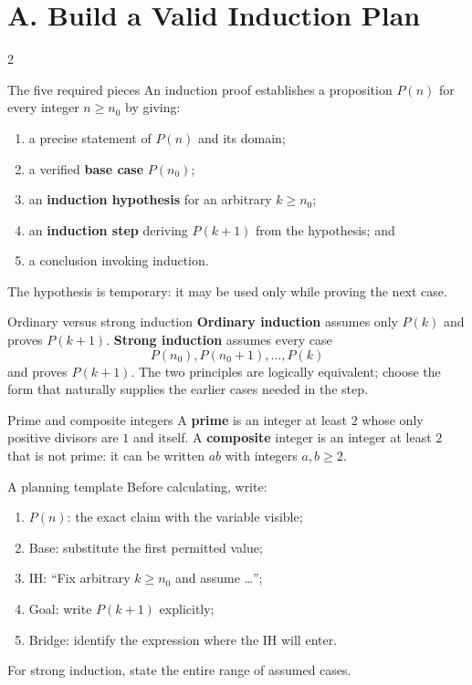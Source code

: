 \documentclass[10pt]{article}
\newcommand{\term}[1]{\textbf{\color{CoreNavy}#1}}
\begin{document}
\small

\section*{A. Build a Valid Induction Plan}
\begin{multicols}{2}
\begin{definitionbox}{The five required pieces}
An induction proof establishes a proposition $P(n)$ for every integer
$n\ge n_0$ by giving:
\begin{enumerate}
  \item a precise statement of $P(n)$ and its domain;
  \item a verified \term{base case} $P(n_0)$;
  \item an \term{induction hypothesis} for an arbitrary $k\ge n_0$;
  \item an \term{induction step} deriving $P(k+1)$ from the hypothesis; and
  \item a conclusion invoking induction.
\end{enumerate}
The hypothesis is temporary: it may be used only while proving the next case.
\end{definitionbox}

\begin{definitionbox}{Ordinary versus strong induction}
\term{Ordinary induction} assumes only $P(k)$ and proves $P(k+1)$.
\term{Strong induction} assumes every case
\[
P(n_0),P(n_0+1),\ldots,P(k)
\]
and proves $P(k+1)$. The two principles are logically equivalent; choose the
form that naturally supplies the earlier cases needed in the step.
\end{definitionbox}

\begin{definitionbox}{Prime and composite integers}
A \term{prime} is an integer at least $2$ whose only positive divisors are
$1$ and itself. A \term{composite} integer is an integer at least $2$ that
is not prime: it can be written $ab$ with integers $a,b\ge2$.
\end{definitionbox}

\begin{methodbox}{A planning template}
Before calculating, write:
\begin{enumerate}
  \item $P(n)$: the exact claim with the variable visible;
  \item Base: substitute the first permitted value;
  \item IH: ``Fix arbitrary $k\ge n_0$ and assume \ldots'';
  \item Goal: write $P(k+1)$ explicitly;
  \item Bridge: identify the expression where the IH will enter.
\end{enumerate}
For strong induction, state the entire range of assumed cases.
\end{methodbox}


\end{multicols}
\end{document}
